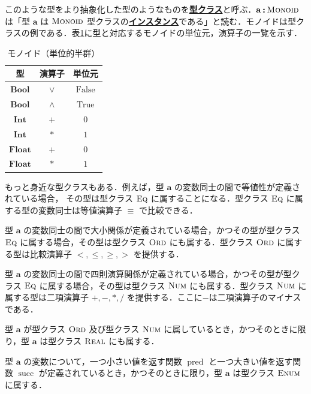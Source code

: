 \documentclass[a4paper,twocolumn]{jsbook}
\newcommand{\keyword}[1]{{\underline{\textbf{#1}}}}
\newcommand{\mSpecialConst}[1]{\mathrm{#1}} %
\newcommand{\mFalse}{\mSpecialConst{False}}
\newcommand{\mTrue}{\mSpecialConst{True}}
\DeclareMathOperator{\mPred}{pred}
\DeclareMathOperator{\mSucc}{succ}
\DeclareMathOperator{\mIn}{{:\!:}}
\newcommand{\mType}[1]{\mathbf{#1}}
\newcommand{\mBoolType}{\mType{Bool}}
\newcommand{\mFloatType}{\mType{Float}}
\newcommand{\mIntType}{\mType{Int}}
\newcommand{\mSpecialTypeClass}[1]{\textsc{#1}} %
\newcommand{\mEnumTypeClass}{\mSpecialTypeClass{Enum}}
\newcommand{\mEqTypeClass}{\mSpecialTypeClass{Eq}}
\newcommand{\mMonoidTypeClass}{\mSpecialTypeClass{Monoid}}
\newcommand{\mNumTypeClass}{\mSpecialTypeClass{Num}}
\newcommand{\mOrdTypeClass}{\mSpecialTypeClass{Ord}}
\newcommand{\mRealTypeClass}{\mSpecialTypeClass{Real}}
\begin{document}
このような型をより抽象化した型のようなものを\keyword{型クラス}と呼ぶ．$\mType{a}\mIn\mMonoidTypeClass$ は「型 $\mType{a}$ は $\mMonoidTypeClass$ 型クラスの\keyword{インスタンス}である」と読む．モノイドは型クラスの例である．表\ref{tab:monoids}に型と対応するモノイドの単位元，演算子の一覧を示す．

\begin{table}
\caption{モノイド（単位的半群）}
\label{tab:monoids}
\begin{center}
\begin{tabular}{||c||c|c||}
\hline
型
    &演算子
    &単位元\\
\hline\hline
$\mBoolType$
    &$\vee$
    &$\mFalse$\\
\hline
$\mBoolType$
    &$\wedge$
    &$\mTrue$\\
\hline
$\mIntType$
    &$+$
    &$0$\\
\hline
$\mIntType$
    &$*$
    &$1$\\
\hline
$\mFloatType$
    &$+$
    &$0$\\
\hline
$\mFloatType$
    &$*$
    &$1$\\
\hline
\end{tabular}
\end{center}
\end{table}


もっと身近な型クラスもある．例えば，型 $\mType{a}$ の変数同士の間で等値性が定義されている場合，
その型は型クラス $\mEqTypeClass$ に属することになる．型クラス $\mEqTypeClass$ に属する型の変数同士は等値演算子 $\equiv$ で比較できる．

型 $\mType{a}$ の変数同士の間で大小関係が定義されている場合，かつその型が型クラス $\mEqTypeClass$ に属する場合，その型は型クラス $\mOrdTypeClass$ にも属する．型クラス $\mOrdTypeClass$ に属する型は比較演算子 $<,\le,\ge,>$ を提供する．

型 $\mType{a}$ の変数同士の間で四則演算関係が定義されている場合，かつその型が型クラス $\mEqTypeClass$ に属する場合，その型は型クラス $\mNumTypeClass$ にも属する．型クラス $\mNumTypeClass$ に属する型は二項演算子 $+,-,*,/$ を提供する．ここに$-$は二項演算子のマイナスである．

型 $\mType{a}$ が型クラス $\mOrdTypeClass$ 及び型クラス $\mNumTypeClass$ に属しているとき，かつそのときに限り，型 $\mType{a}$ は型クラス $\mRealTypeClass$ にも属する．

型 $\mType{a}$ の変数について，一つ小さい値を返す関数 $\mPred$ と一つ大きい値を返す関数 $\mSucc$ が定義されているとき，かつそのときに限り，型 $\mType{a}$ は型クラス $\mEnumTypeClass$ に属する．
\end{document}
